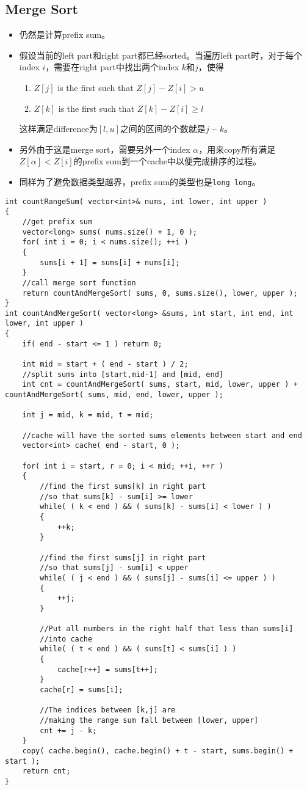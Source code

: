 \subsection{Merge Sort}
\begin{itemize}
\item 仍然是计算prefix sum。
\item 假设当前的left part和right part都已经sorted。当遍历left part时，对于每个index $i$，需要在right part中找出两个index $k$和$j$，使得
\begin{enumerate}
\item $ Z[j] $ is the first such that $Z[j] - Z[i] > u$
\item $ Z[k] $ is the first such that $ Z[k] - Z[i] \geq l $
\end{enumerate}
这样满足difference为$ [l,u] $之间的区间的个数就是$j-k$。
\item 另外由于这是merge sort，需要另外一个index $\alpha$，用来copy所有满足$Z[\alpha]<Z[i]$的prefix sum到一个cache中以便完成排序的过程。
\item 同样为了避免数据类型越界，prefix sum的类型也是\texttt{long long}。
\end{itemize}
\begin{lstlisting}[style=customc, caption={Merge Sort}]
int countRangeSum( vector<int>& nums, int lower, int upper )
{
    //get prefix sum
    vector<long> sums( nums.size() + 1, 0 );
    for( int i = 0; i < nums.size(); ++i )
    {
        sums[i + 1] = sums[i] + nums[i];
    }
    //call merge sort function
    return countAndMergeSort( sums, 0, sums.size(), lower, upper );
}
int countAndMergeSort( vector<long> &sums, int start, int end, int lower, int upper )
{
    if( end - start <= 1 ) return 0;

    int mid = start + ( end - start ) / 2;
    //split sums into [start,mid-1] and [mid, end]
    int cnt = countAndMergeSort( sums, start, mid, lower, upper ) + countAndMergeSort( sums, mid, end, lower, upper );

    int j = mid, k = mid, t = mid;

    //cache will have the sorted sums elements between start and end
    vector<int> cache( end - start, 0 );

    for( int i = start, r = 0; i < mid; ++i, ++r )
    {
        //find the first sums[k] in right part
        //so that sums[k] - sum[i] >= lower
        while( ( k < end ) && ( sums[k] - sums[i] < lower ) )
        {
            ++k;
        }

        //find the first sums[j] in right part
        //so that sums[j] - sum[i] < upper
        while( ( j < end ) && ( sums[j] - sums[i] <= upper ) )
        {
            ++j;
        }

        //Put all numbers in the right half that less than sums[i]
        //into cache
        while( ( t < end ) && ( sums[t] < sums[i] ) )
        {
            cache[r++] = sums[t++];
        }
        cache[r] = sums[i];

        //The indices between [k,j] are
        //making the range sum fall between [lower, upper]
        cnt += j - k;
    }
    copy( cache.begin(), cache.begin() + t - start, sums.begin() + start );
    return cnt;
}
\end{lstlisting}

